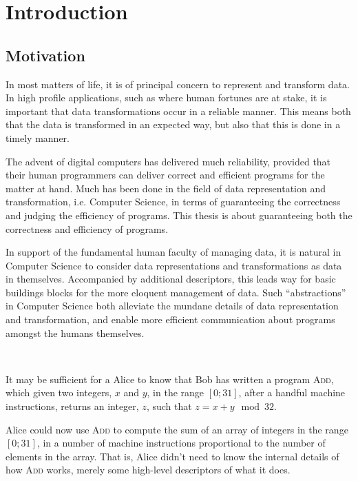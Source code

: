 \chapter{Introduction}


\section{Motivation}

In most matters of life, it is of principal concern to represent and transform
data. In high profile applications, such as where human fortunes are at stake,
it is important that data transformations occur in a reliable manner.  This
means both that the data is transformed in an expected way, but also that this
is done in a timely manner.

The advent of digital computers has delivered much reliability, provided that
their human programmers can deliver correct and efficient programs for the
matter at hand. Much has been done in the field of data representation and
transformation, i.e. Computer Science, in terms of guaranteeing the correctness
and judging the efficiency of programs. This thesis is about guaranteeing
both the correctness and efficiency of programs.

In support of the fundamental human faculty of managing data, it is natural in
Computer Science to consider data representations and transformations as data
in themselves. Accompanied by additional descriptors, this leads way for basic
buildings blocks for the more eloquent management of data. Such
``abstractions'' in Computer Science both alleviate the mundane details of data
representation and transformation, and enable more efficient communication
about programs amongst the humans themselves.

\begin{example} \label{example:alice-bob-add} \ 

It may be sufficient for a Alice to know that Bob has written a program
\textsc{Add}, which given two integers, $x$ and $y$, in the range $[0;31]$,
after a handful machine instructions, returns an integer, $z$, such that $z=x+y
\mod 32$.

Alice could now use \textsc{Add} to compute the sum of an array of integers in
the range $[0;31]$, in a number of machine instructions proportional to the
number of elements in the array. That is, Alice didn't need to know the
internal details of how \textsc{Add} works, merely some high-level descriptors
of what it does.

\end{example}


